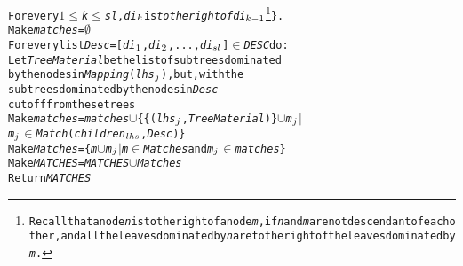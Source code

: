 \begin{alltt}
                                   For every \(1\leq\){\it{}k}\(\leq\){\it{}sl}, {\it{}di}\(\sb{k}\) is {\it{}to the right of} {\it{}di}\(\sb{k-1}\)\footnote{Recall that a node {\it{}n} is to the right of a node {\it{}m}, if {\it{}n} and {\it{}m} are not descendant of each other, and all the leaves dominated by {\it{}n} are to the right of the leaves dominated by {\it{}m}.} \}.
                      Make {\it{}matches} = \(\emptyset\)
                      For every list {\it{}Desc} = [{\it{}di}\(\sb{1}\),{\it{}di}\(\sb{2}\),...,{\it{}di}\(\sb{sl}\)] \(\in\) {\it{}DESC} do: 
                          Let {\it{}TreeMaterial} be the list of subtrees dominated 
                                   by the nodes in {\it{}Mapping}({\it{}lhs}\(\sb{j}\)), but, with the
                                   subtrees dominated by the nodes in {\it{}Desc}
                                   cut off from these trees 
                          Make {\it{}matches} = {\it{}matches} \(\cup\) \{\{({\it{}lhs}\(\sb{j}\), {\it{}TreeMaterial})\}\(\cup\){\it{}m}\(\sb{j}\) \(\mid\)
                                  {\it{}m}\(\sb{j}\) \(\in\) {\it{}Match}({\it{}children}\(\sb{lhs}\), {\it{}Desc})\} 
                      Make {\it{}Matches} = \{ {\it{}m}\(\cup\){\it{}m}\(\sb{j}\) \(\mid\) {\it{}m} \(\in\) {\it{}Matches} and {\it{}m}\(\sb{j}\) \(\in\) {\it{}matches} \}
           Make {\it{}MATCHES} = {\it{}MATCHES} \(\cup\) {\it{}Matches}
       Return {\it{}MATCHES}
\end{alltt}


